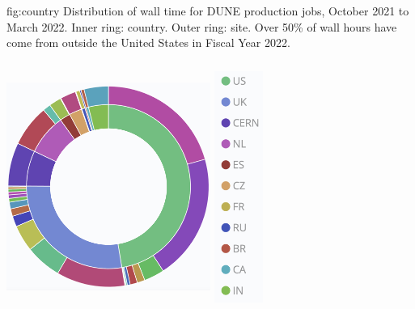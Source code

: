 \documentclass[../main-v1.tex]{subfiles}
\begin{document}
\begin{dunefigure}
{fig:country}
{Distribution of wall time for DUNE production jobs, October 2021 to March 2022. Inner ring: country. Outer ring: site. Over 50\% of wall hours have come from outside the United States in Fiscal Year 2022.}
{\includegraphics[height=3.5in,width=0.5\textwidth]{graphics/Workflow/walltimeplot.png}
\includegraphics[height=3.5in,width=0.12\textwidth]{graphics/Workflow/walltimecountry.png}
}
\end{dunefigure}
\end{document}
